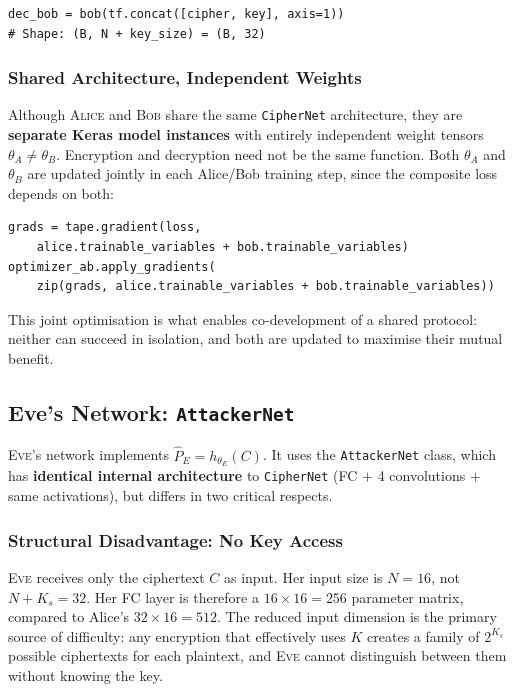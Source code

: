 \documentclass[12pt, a4paper]{article}
\newcommand{\alice}{\textsc{Alice}}
\newcommand{\bob}{\textsc{Bob}}
\newcommand{\eve}{\textsc{Eve}}
\newcommand{\thetaA}{\theta_{\!A}}
\newcommand{\thetaB}{\theta_{\!B}}
\newcommand{\thetaE}{\theta_{\!E}}
\newcommand{\code}[1]{\texttt{\color{CodeRed}#1}}
\begin{document}
\begin{lstlisting}[caption={Bob's input: ciphertext concatenated with the shared key}]
dec_bob = bob(tf.concat([cipher, key], axis=1))
# Shape: (B, N + key_size) = (B, 32)
\end{lstlisting}

\subsubsection*{Shared Architecture, Independent Weights}

Although \alice{} and \bob{} share the same \code{CipherNet} architecture,
they are \textbf{separate Keras model instances} with entirely independent
weight tensors $\thetaA \neq \thetaB$. Encryption and decryption need not
be the same function. Both $\thetaA$ and $\thetaB$ are updated jointly in
each Alice/Bob training step, since the composite loss depends on both:

\begin{lstlisting}[caption={Joint update of Alice and Bob parameters}]
grads = tape.gradient(loss,
    alice.trainable_variables + bob.trainable_variables)
optimizer_ab.apply_gradients(
    zip(grads, alice.trainable_variables + bob.trainable_variables))
\end{lstlisting}

This joint optimisation is what enables co-development of a shared
protocol: neither can succeed in isolation, and both are updated to
maximise their mutual benefit.

\subsection{Eve's Network: \texttt{AttackerNet}}
\label{subsec:eve_net}

\eve{}'s network implements $\hat{P}_E = h_{\thetaE}(C)$. It uses the
\code{AttackerNet} class, which has \textbf{identical internal architecture}
to \code{CipherNet} (FC $+$ 4 convolutions $+$ same activations), but
differs in two critical respects.

\subsubsection*{Structural Disadvantage: No Key Access}

\eve{} receives only the ciphertext $C$ as input. Her input size is $N=16$,
not $N+K_s=32$. Her FC layer is therefore a $16\times16=256$ parameter
matrix, compared to Alice's $32\times16=512$. The reduced input dimension
is the primary source of difficulty: any encryption that effectively uses
$K$ creates a family of $2^{K_s}$ possible ciphertexts for each plaintext,
and \eve{} cannot distinguish between them without knowing the key.
\end{document}
